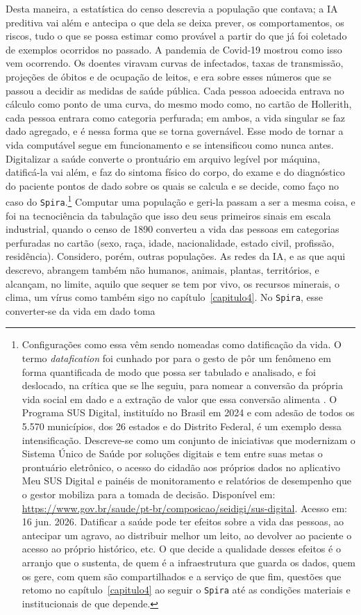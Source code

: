 Desta maneira, a estatística do censo descrevia a população que contava; a IA preditiva vai além e antecipa o que dela se deixa prever, os comportamentos, os riscos, tudo o que se possa estimar como provável a partir do que já foi coletado de exemplos ocorridos no passado. A pandemia de Covid-19 mostrou como isso vem ocorrendo. Os doentes viravam curvas de infectados, taxas de transmissão, projeções de óbitos e de ocupação de leitos, e era sobre esses números que se passou a decidir as medidas de saúde pública. Cada pessoa adoecida entrava no cálculo como ponto de uma curva, do mesmo modo como, no cartão de Hollerith, cada pessoa entrara como categoria perfurada; em ambos, a vida singular se faz dado agregado, e é nessa forma que se torna governável. Esse modo de tornar a vida computável segue em funcionamento e se intensificou como nunca antes. Digitalizar a saúde converte o prontuário em arquivo legível por máquina, datificá-la vai além, e faz do sintoma físico do corpo, do exame e do diagnóstico do paciente pontos de dado sobre os quais se calcula e se decide, como faço no caso do \texttt{Spira}.\footnote{Configurações como essa vêm sendo nomeadas como datificação da vida. O termo \emph{datafication} foi cunhado por \textcite{MayerSchonberger2013Big} para o gesto de pôr um fenômeno em forma quantificada de modo que possa ser tabulado e analisado, e foi deslocado, na crítica que se lhe seguiu, para nomear a conversão da própria vida social em dado e a extração de valor que essa conversão alimenta \parencite{vanDijck2014Datafication, CouldryMejias2019Costs}. O Programa SUS Digital, instituído no Brasil em 2024 e com adesão de todos os 5.570 municípios, dos 26 estados e do Distrito Federal, é um exemplo dessa intensificação. Descreve-se como um conjunto de iniciativas que modernizam o Sistema Único de Saúde por soluções digitais e tem entre suas metas o prontuário eletrônico, o acesso do cidadão aos próprios dados no aplicativo Meu SUS Digital e painéis de monitoramento e relatórios de desempenho que o gestor mobiliza para a tomada de decisão. Disponível em: \url{https://www.gov.br/saude/pt-br/composicao/seidigi/sus-digital}. Acesso em: 16 jun. 2026. Datificar a saúde pode ter efeitos sobre a vida das pessoas, ao antecipar um agravo, ao distribuir melhor um leito, ao devolver ao paciente o acesso ao próprio histórico, etc. O que decide a qualidade desses efeitos é o arranjo que o sustenta, de quem é a infraestrutura que guarda os dados, quem os gere, com quem são compartilhados e a serviço de que fim, questões que retomo no capítulo~\ref{capitulo4} ao seguir o \texttt{Spira} até as condições materiais e institucionais de que depende.} Computar uma população e geri-la passam a ser a mesma coisa, e foi na tecnociência da tabulação que isso deu seus primeiros sinais em escala industrial, quando o censo de 1890 converteu a vida das pessoas em categorias perfuradas no cartão (sexo, raça, idade, nacionalidade, estado civil, profissão, residência). Considero, porém, outras populações. As redes da IA, e as que aqui descrevo, abrangem também não humanos, animais, plantas, territórios, e alcançam, no limite, aquilo que sequer se tem por vivo, os recursos minerais, o clima, um vírus como também sigo no capítulo~\ref{capitulo4}. No \texttt{Spira}, esse converter-se da vida em dado toma 